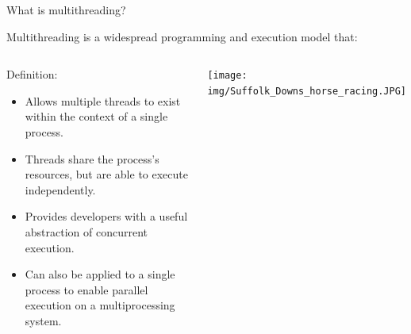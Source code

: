 \documentclass[8pt]{beamer}
\begin{document}
\begin{frame}{What is multithreading?}

Multithreading is a widespread programming and execution model that:

\begin{columns}
 
\begin{block}{Definition:}
 
\begin{itemize}
  \item Allows multiple threads to exist within the context of a single process.
  \item Threads share the process's resources, but are able to execute independently.
  \item Provides developers with a useful abstraction of concurrent execution.
  \item Can also be applied to a single process to enable parallel execution on a multiprocessing system.
\end{itemize}
 
\end{block}
 
\begin{block}

\texttt{[image: img/Suffolk\_Downs\_horse\_racing.JPG]}

\end{block}

\end{columns}

\end{frame}
\end{document}
